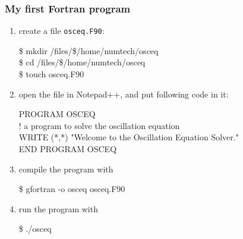 \documentclass[aspectratio=43,9pt]{beamer}
\begin{document}
\begin{frame}
	\frametitle{My first Fortran program}
	\begin{enumerate}
		\item create a file \texttt{osceq.F90}:
			\par\vspace*{1ex}\hspace*{.05\textwidth}\parbox{.8\textwidth}{\ttfamily
				\$   mkdir  /files/\$/home/numtech/osceq\\
				\$   cd  /files/\$/home/numtech/osceq\\
				\$   touch  osceq.F90
			}\vspace*{1ex}\par\vspace*{2ex}
		\item open the file in Notepad++, and put following code in it:
			\par\vspace*{1ex}\hspace*{.05\textwidth}\parbox{.8\textwidth}{\ttfamily\small
				PROGRAM OSCEQ\\[3ex]
				! a program to solve the oscillation equation\\[3ex]
				WRITE (*,*) "Welcome to the Oscillation Equation Solver."\\[3ex]
				END PROGRAM OSCEQ
			}\hspace*{-.5\textwidth}\vspace*{1ex}\par\vspace*{2ex}
		\item compile the program with
			\par\vspace*{1ex}\hspace*{.05\textwidth}\parbox{.5\textwidth}{\ttfamily
				\$   gfortran -o osceq osceq.F90
			}\vspace*{1ex}\par\vspace*{2ex}
		\item run the program with
			\par\vspace*{1ex}\hspace*{.05\textwidth}\parbox{.5\textwidth}{\ttfamily
				\$   ./osceq
			}\vspace*{1ex}\par
	\end{enumerate}
\end{frame}
\end{document}
